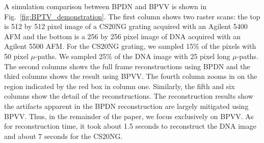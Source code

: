 \documentclass[twocolumn,oneside]{IEEEtran/IEEEtran}
\begin{document}



A simulation comparison between BPDN and BPVV is shown in
Fig.~\ref{fig:BPTV_demonstration}. The first column shows two raster
scans: the top is 512 by 512 pixel image of a CS20NG grating acquired
with an Agilent 5400 AFM and the bottom is a 256 by 256 pixel image of
DNA acquired with an Agilent 5500 AFM. For the CS20NG grating, we
sampled 15\% of the pixels with 50 pixel $\mu$-paths. We sampled 25\%
of the DNA image with 25 pixel long $\mu$-paths. The second columns
shows the full frame reconstructions using BPDN and the third columns
shows the result using BPVV. The fourth column zooms in on the region
indicated by the red box in column one. Similarly, the fifth and six
columns show the detail of the reconstructions. The reconstruction
results show the artifacts apparent in the BPDN reconstruction are
largely mitigated using BPVV. Thus, in the remainder of the paper, we
focus exclusively on BPVV. As for reconstruction time, it took about
1.5 seconds to reconstruct the DNA image and about 7 seconds for the
CS20NG.
	

\end{document}
